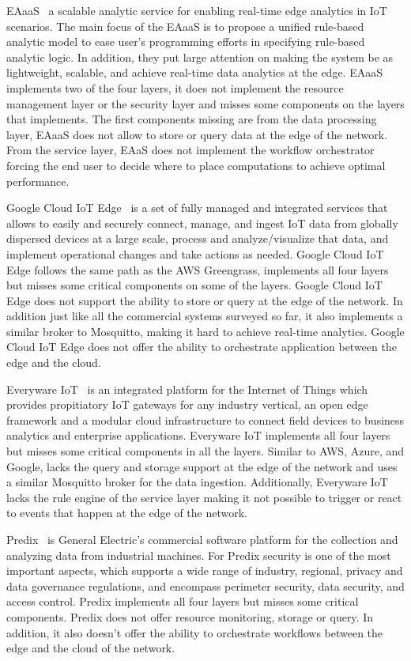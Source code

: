 EAaaS~\cite{8029781} a scalable analytic service for enabling real-time edge analytics in IoT scenarios. The main focus of the EAaaS is to propose a unified rule-based analytic model to ease user's programming efforts in specifying rule-based analytic logic. In addition, they put large attention on making the system be as lightweight, scalable, and achieve real-time data analytics at the edge. EAaaS implements two of the four layers, it does not implement the resource management layer or the security layer and misses some components on the layers that implements. The first components missing are from the data processing layer, EAaaS does not allow to store or query data at the edge of the network. From the service layer, EAaS does not implement the workflow orchestrator forcing the end user to decide where to place computations to achieve optimal performance. 

Google Cloud IoT Edge~\cite{google} is a set of fully managed and integrated services that allows to easily and securely connect, manage, and ingest IoT data from globally dispersed devices at a large scale, process and analyze/visualize that data, and implement operational changes and take actions as needed. Google Cloud IoT Edge follows the same path as the AWS Greengrass, implements all four layers but misses some critical components on some of the layers. Google Cloud IoT Edge does not support the ability to store or query at the edge of the network. In addition just like all the commercial systems surveyed so far, it also implements a similar broker to Mosquitto, making it hard to achieve real-time analytics. Google Cloud IoT Edge does not offer the ability to orchestrate application between the edge and the cloud.

Everyware IoT~\cite{everyware} is an integrated platform for the Internet of Things which provides propitiatory IoT gateways for any industry vertical, an open edge framework and a modular cloud infrastructure to connect field devices to business analytics and enterprise applications. Everyware IoT implements all four layers but misses some critical components in all the layers. Similar to AWS, Azure, and Google, lacks the query and storage support at the edge of the network and uses a similar Mosquitto broker for the data ingestion. Additionally, Everyware IoT lacks the rule engine of the service layer making it not possible to trigger or react to events that happen at the edge of the network.

Predix~\cite{predix} is General Electric's commercial software platform for the collection and analyzing data from industrial machines. For Predix security is one of the most important aspects, which supports a wide range of industry, regional, privacy and data governance regulations, and encompass perimeter security, data security, and access control. Predix implements all four layers but misses some critical components. Predix does not offer resource monitoring, storage or query. In addition, it also doesn't offer the ability to orchestrate workflows between the edge and the cloud of the network.

